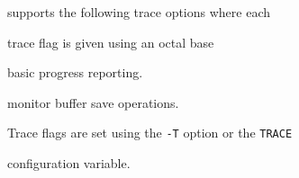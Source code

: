 












 supports the following trace options where each


trace flag is given using an octal base


\begin{optlist}





  basic progress reporting. 


  monitor buffer save operations.


\end{optlist}


Trace flags are set using the \texttt{-T} option or the  \texttt{TRACE} 


configuration variable.

























